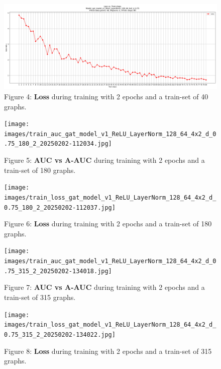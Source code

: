 \documentclass[11pt]{article}
\begin{document}
	\begin{figure}[h!] %
		\centering
		\label{figure_4}
		\includegraphics[width=1\textwidth]{images/train_loss_gat_model_v1_ReLU_LayerNorm_128_64_4x2_d_0.75_40_2_20250202-144007.jpg}
		\caption{Figure 4: \textbf{Loss} during training with 2 epochs and a train-set of 40 graphs.}
	\end{figure}
	
	\begin{figure}[h!] %
		\centering
		\texttt{[image: images/train\_auc\_gat\_model\_v1\_ReLU\_LayerNorm\_128\_64\_4x2\_d\_0.75\_180\_2\_20250202-112034.jpg]}
		\caption{Figure 5: \textbf{AUC vs A-AUC} during training with 2 epochs and a train-set of 180 graphs.}
		\label{figure_5}
	\end{figure}
	
	\begin{figure}[h!] %
		\centering
		\texttt{[image: images/train\_loss\_gat\_model\_v1\_ReLU\_LayerNorm\_128\_64\_4x2\_d\_0.75\_180\_2\_20250202-112037.jpg]}
		\caption{Figure 6: \textbf{Loss} during training with 2 epochs and a train-set of 180 graphs.}
		\label{figure_6}
	\end{figure}
	
	\begin{figure}[h!] %
		\centering
		\texttt{[image: images/train\_auc\_gat\_model\_v1\_ReLU\_LayerNorm\_128\_64\_4x2\_d\_0.75\_315\_2\_20250202-134018.jpg]}
		\caption{Figure 7: \textbf{AUC vs A-AUC} during training with 2 epochs and a train-set of 315 graphs.}
		\label{figure_7}
	\end{figure}
	
	\begin{figure}[h!] %
		\centering
		\texttt{[image: images/train\_loss\_gat\_model\_v1\_ReLU\_LayerNorm\_128\_64\_4x2\_d\_0.75\_315\_2\_20250202-134022.jpg]}
		\caption{Figure 8: \textbf{Loss} during training with 2 epochs and a train-set of 315 graphs.}
		\label{figure_8}
	\end{figure}
	
\end{document}
